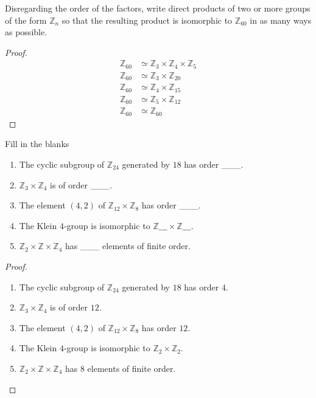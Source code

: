\begin{exercise}
    Disregarding the order of the factors, write direct products of two or more groups of the form $\mathbb{Z}_{n}$ so that the resulting product is isomorphic to $\mathbb{Z}_{60}$ in as many ways as possible.
\end{exercise}

\begin{proof}
    \begingroup
    \allowdisplaybreaks{}
    \begin{align*}
        \mathbb{Z}_{60} & \simeq \mathbb{Z}_{3}\times\mathbb{Z}_{4}\times\mathbb{Z}_{5} \\
        \mathbb{Z}_{60} & \simeq \mathbb{Z}_{3}\times\mathbb{Z}_{20}                    \\
        \mathbb{Z}_{60} & \simeq \mathbb{Z}_{4}\times\mathbb{Z}_{15}                    \\
        \mathbb{Z}_{60} & \simeq \mathbb{Z}_{5}\times\mathbb{Z}_{12}                    \\
        \mathbb{Z}_{60} & \simeq \mathbb{Z}_{60}
    \end{align*}
    \endgroup
\end{proof}

\begin{exercise}
    Fill in the blanks
    \begin{enumerate}[label={\textbf{\alph*.}}]
        \item The cyclic subgroup of $\mathbb{Z}_{24}$ generated by $18$ has order \_\_\_.
        \item $\mathbb{Z}_{3}\times\mathbb{Z}_{4}$ is of order \_\_\_.
        \item The element $(4,2)$ of $\mathbb{Z}_{12}\times\mathbb{Z}_{8}$ has order \_\_\_.
        \item The Klein $4$-group is isomorphic to $\mathbb{Z}\_\_\_\times\mathbb{Z}\_\_\_$.
        \item $\mathbb{Z}_{2}\times\mathbb{Z}\times\mathbb{Z}_{4}$ has \_\_\_ elements of finite order.
    \end{enumerate}
\end{exercise}

\begin{proof}
    \begin{enumerate}[label={\textbf{\alph*.}}]
        \item The cyclic subgroup of $\mathbb{Z}_{24}$ generated by $18$ has order $4$.
        \item $\mathbb{Z}_{3}\times\mathbb{Z}_{4}$ is of order $12$.
        \item The element $(4,2)$ of $\mathbb{Z}_{12}\times\mathbb{Z}_{8}$ has order $12$.
        \item The Klein $4$-group is isomorphic to $\mathbb{Z}_{2}\times\mathbb{Z}_{2}$.
        \item $\mathbb{Z}_{2}\times\mathbb{Z}\times\mathbb{Z}_{4}$ has $8$ elements of finite order.
    \end{enumerate}
\end{proof}

